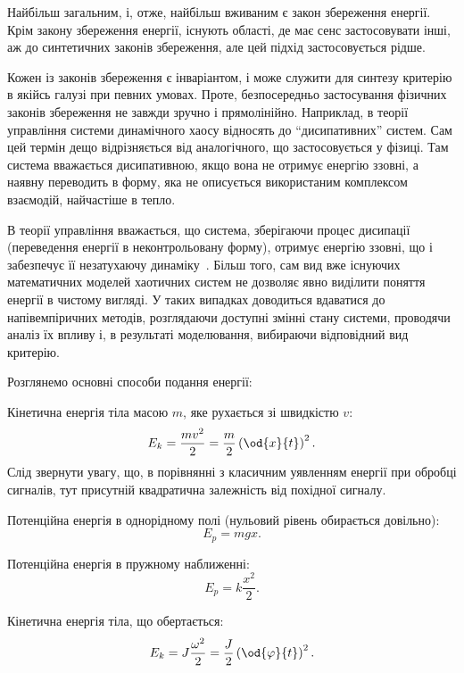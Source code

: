 Найбільш загальним, і, отже, найбільш вживаним є закон збереження енергії.
Крім закону збереження енергії, існують області, де має сенс
застосовувати інші, аж до синтетичних законів збереження, але
цей підхід застосовується рідше.

Кожен із законів збереження є інваріантом, і може служити для
синтезу критерію в якійсь галузі при певних умовах. Проте,
безпосередньо застосування фізичних законів збереження не
завжди зручно і прямолінійно. Наприклад, в теорії управління
системи динамічного хаосу відносять до ``дисипативних''
систем. Сам цей термін дещо відрізняється від аналогічного, що
застосовується у фізиці. Там система вважається дисипативною,
якщо вона не отримує енергію ззовні,
а наявну переводить в форму, яка не
описується використаним комплексом взаємодій, найчастіше
в тепло.

В теорії управління вважається, що система, зберігаючи
процес дисипації (переведення енергії в неконтрольовану
форму), отримує енергію ззовні, що і забезпечує її незатухаючу
динаміку~\cite{prigogine_selforganization, chernavskii_syn_info, prigogine_order_from_chaos}. Більш
того, сам вид вже існуючих математичних моделей хаотичних систем
не дозволяє явно виділити поняття енергії в чистому вигляді. У
таких випадках доводиться вдаватися до напівемпіричних методів,
розглядаючи доступні змінні стану системи, проводячи аналіз
їх впливу і, в результаті моделювання, вибираючи відповідний
вид критерію.


Розглянемо основні способи подання енергії:

Кінетична енергія тіла масою $m$, яке рухається зі швидкістю $v$:
%
\begin{equation}
  E_k = \frac{mv^2}{2} = \frac{m}{2} \left( \od{x}{t} \right)^2.
  \label{atu:eq:Ek_v}
\end{equation}
%
Слід звернути увагу, що, в порівнянні з класичним уявленням
енергії при обробці сигналів, тут присутній квадратична
залежність від похідної сигналу.

Потенційна енергія в однорідному полі (нульовий рівень обирається довільно):
%
\begin{equation}
  E_p = m g x .
  \label{atu:eq:Ep_g}
\end{equation}

Потенційна енергія в пружному наближенні:
%
\begin{equation}
  E_p = k \frac{x^2}{2} .
  \label{atu:eq:Ep_spring}
\end{equation}

Кінетична енергія тіла, що обертається:
%
\begin{equation}
  E_k = J \frac{\omega^2}{2} = \frac{J}{2} \left( \od{\varphi}{t} \right)^2 .
  \label{atu:eq:Ek_spin}
\end{equation}


